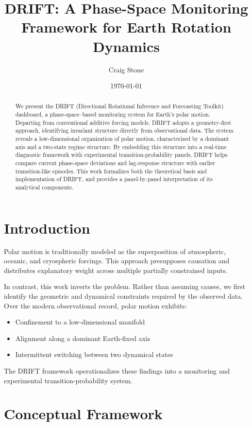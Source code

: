 \documentclass[11pt]{article}
\title{\textbf{DRIFT: A Phase-Space Monitoring Framework for Earth Rotation Dynamics}}
\author{Craig Stone}
\date{\today}
\begin{document}
\maketitle

\begin{abstract}
We present the DRIFT (Directional Rotational Inference and Forecasting Toolkit) dashboard, a phase-space–based monitoring system for Earth’s polar motion. Departing from conventional additive forcing models, DRIFT adopts a geometry-first approach, identifying invariant structure directly from observational data. The system reveals a low-dimensional organization of polar motion, characterized by a dominant axis and a two-state regime structure. By embedding this structure into a real-time diagnostic framework with experimental transition-probability panels, DRIFT helps compare current phase-space deviations and lag-response structure with earlier transition-like episodes. This work formalizes both the theoretical basis and implementation of DRIFT, and provides a panel-by-panel interpretation of its analytical components.
\end{abstract}

\section{Introduction}

Polar motion is traditionally modeled as the superposition of atmospheric, oceanic, and cryospheric forcings. This approach presupposes causation and distributes explanatory weight across multiple partially constrained inputs.

In contrast, this work inverts the problem. Rather than assuming causes, we first identify the geometric and dynamical constraints required by the observed data. Over the modern observational record, polar motion exhibits:

\begin{itemize}
\item Confinement to a low-dimensional manifold
\item Alignment along a dominant Earth-fixed axis
\item Intermittent switching between two dynamical states
\end{itemize}

The DRIFT framework operationalizes these findings into a monitoring and experimental transition-probability system.

\section{Conceptual Framework}
\end{document}
